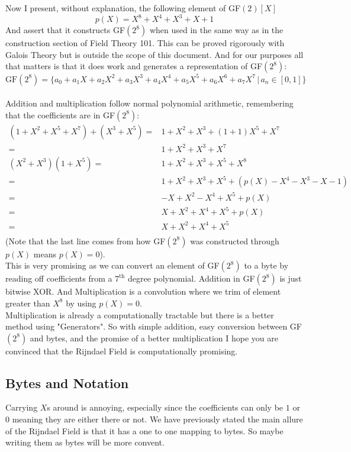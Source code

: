 Now I present, without explanation, the following element of GF$(2)[X]$
\[p(X) = X^8+X^4+X^3+X+1\]
And assert that it constructs GF$(2^8)$ when used in the same way as in the construction section of Field Theory 101.
This can be proved rigorously with Galois Theory but is outside the scope of this document.
And for our purposes all that matters is that it does work and generates a representation of GF$(2^8)$:
\[\text{GF}(2^8) = \{a_0 + a_1X+a_2X^2+a_3X^3+a_4X^4+a_5X^5+a_6X^6+a_7X^7\,|\,a_n\in[0,1]\}\]
\\

Addition and multiplication follow normal polynomial arithmetic,
remembering that the coefficients are in GF$(2^8)$:
\begin{equation*}
\begin{aligned}
	(1+X^2+X^5+X^7) + (X^3+X^5) =& 1+X^2 +X^3+(1+1)X^5+X^7\\
	=& 1+X^2 +X^3 +X^7\\
	(X^2+X^3) (1+X^5) =& 1+X^2+X^3+X^5+X^8 \\
	=& 1+X^2+X^3+X^5+(p(X)-X^4-X^3-X-1) \\
	=& -X+X^2-X^4+X^5+p(X) \\
	=& X+X^2+X^4+X^5+p(X) \\
	=& X+X^2+X^4+X^5 \\
\end{aligned}
\end{equation*}
(Note that the last line comes from how GF$(2^8)$ was constructed through $p(X)$ means $p(X) = 0$).
\\

This is very promising as we can convert an element of GF$(2^8)$ to a byte by reading off coefficients from a $7^\text{th}$ degree polynomial.
Addition in GF$(2^8)$ is just bitwise XOR.
And Multiplication is a convolution where we trim of element greater than $X^8$ by using $p(X)=0$. 
\\

Multiplication is already a computationally tractable but there is a better method using "Generators".
So with simple addition, easy conversion between GF$(2^8)$ and bytes, and the promise of a better multiplication I hope you are convinced that the Rijndael Field is computationally promising.

\subsection{Bytes and Notation}
Carrying $X$s around is annoying, 
especially since the coefficients can only be $1$ or $0$ meaning they are either there or not.
We have previously stated the main allure of the Rijndael Field is that it has a one to one mapping to bytes.
So maybe writing them as bytes will be more convent.

